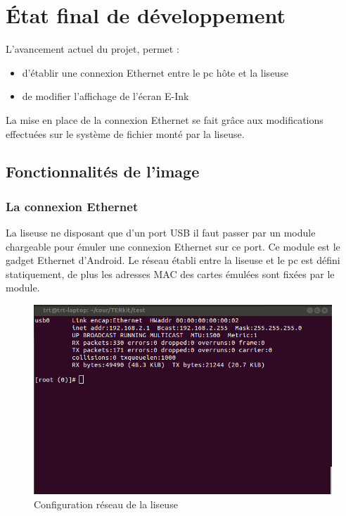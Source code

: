 \chapter{État final de développement}

L'avancement actuel du projet, permet : 
\begin{itemize}
	\item d'établir une connexion Ethernet entre le pc hôte et la liseuse
	\item de modifier l'affichage de l'écran E-Ink
\end{itemize}

La mise en place de la connexion Ethernet se fait grâce aux modifications effectuées sur le système de fichier monté par la liseuse.

\section{Fonctionnalités de l'image} %

\subsection{La connexion Ethernet}
La liseuse ne disposant que d'un port USB il faut passer par un module chargeable pour émuler une connexion Ethernet sur ce port.
Ce module est le gadget Ethernet d'Android.
Le réseau établi entre la liseuse et le pc est défini statiquement, de plus les adresses MAC des cartes émulées sont fixées par le module.

\begin{figure}[]
	\begin{center}
	\includegraphics[scale=0.5]{capt_prs_ifconfig.png}	
	\end{center}
	\caption{Configuration réseau de la liseuse}
\end{figure}

